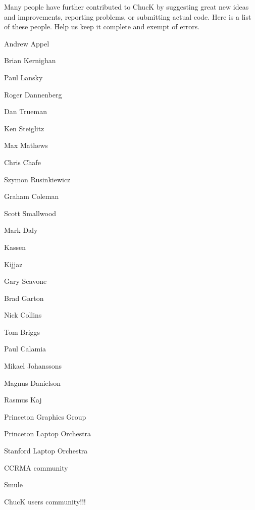 Many people have further contributed to ChucK by suggesting great new ideas and improvements, reporting problems, or submitting actual code. Here is a list of these people.  Help us keep it complete and exempt of errors.

\begin{chuckitemize}
\item Andrew Appel 
\item Brian Kernighan 
\item Paul Lansky 
\item Roger Dannenberg
\item Dan Trueman 
\item Ken Steiglitz 
\item Max Mathews
\item Chris Chafe
\item Szymon Rusinkiewicz 
\item Graham Coleman
\item Scott Smallwood
\item Mark Daly
\item Kassen
\item Kijjaz
\item Gary Scavone 
\item Brad Garton
\item Nick Collins 
\item Tom Briggs 
\item Paul Calamia 
\item Mikael Johanssons 
\item Magnus Danielson 
\item Rasmus Kaj 
\item Princeton Graphics Group
\item Princeton Laptop Orchestra
\item Stanford Laptop Orchestra
\item CCRMA community
\item Smule
\item ChucK users community!!!
\end{chuckitemize}
